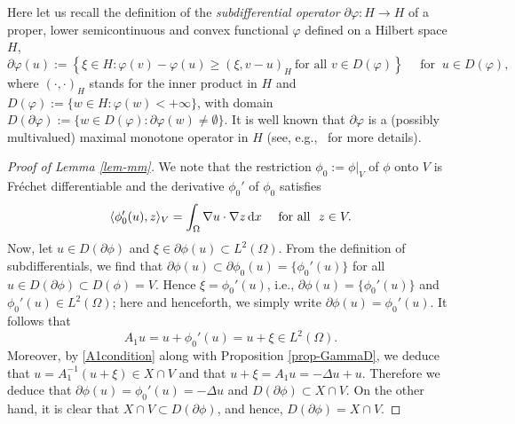 \documentclass[reqno,10pt]{amsart}
\begin{document}
Here let us recall the definition of the \emph{subdifferential operator}
$\partial \varphi : H \to H$ of a proper, lower semicontinuous and
convex functional $\varphi$ defined on a Hilbert space $H$,
\begin{equation}\label{subdif}
\partial \varphi(u) := \left\{
\xi \in H \colon \varphi(v) - \varphi(u) \geq (\xi, v - u)_H \ \mbox{
for all } v \in D(\varphi)
\right\}
\quad \mbox{ for } \ u \in D(\varphi),
\end{equation}
where $(\cdot,\cdot)_H$ stands for the inner product in $H$ and
$D(\varphi) := \{w \in H \colon \varphi(w) < +\infty\}$,
with domain $D(\partial \varphi) := \{w \in D(\varphi) \colon \partial
\varphi (w) \neq \emptyset\}$. It is well known that $\partial \varphi$
is a (possibly multivalued) maximal monotone operator in $H$ (see,
e.g.,~\cite{Bre73} for more details).
\begin{proof}[Proof of Lemma \ref{lem-mm}]
We note that the restriction $\phi_0 := \phi|_V$ of $\phi$ onto
 $V$ is Fr\'echet differentiable and the derivative $\phi_0'$ of
 $\phi_0$ satisfies
\begin{equation}\label{4}
\langle \phi_0'(u), z \rangle_V = \int_\Omega \nabla u \cdot
      \nabla z \, {\text{\rm d}} x \quad \mbox{ for all } \ z \in V.
\end{equation}
 Now, let $u \in D(\partial \phi)$ and $\xi \in \partial \phi(u) \subset
 L^2(\Omega)$. From the definition of subdifferentials, we find that $\partial
 \phi(u) \subset \partial \phi_0(u) = \{\phi_0'(u)\}$ for all $u \in
 D(\partial \phi) \subset D(\phi) = V$. Hence $\xi = \phi_0'(u)$, i.e.,
 $\partial \phi(u) = \{\phi_0'(u)\}$ and $\phi_0'(u) \in L^2(\Omega)$;
 here and henceforth, we simply write $\partial \phi(u) =
 \phi_0'(u)$. It follows that
$$
A_1 u = u + \phi_0'(u) = u + \xi \in L^2(\Omega). 
$$
Moreover, by \eqref{A1condition} along with Proposition
 \ref{prop-GammaD}, we deduce that $u = A_1^{-1} (u + \xi) \in X
 \cap V$ and that $u + \xi = A_1 u = - \Delta u + u$.
Therefore we deduce that $\partial \phi(u) = \phi_0'(u) = -\Delta u$ and
 $D(\partial \phi) \subset X \cap V$. On the other hand, it is clear
 that $X \cap V \subset D(\partial \phi)$, and hence, $D(\partial \phi)
 = X \cap V$.
\end{proof} 
\end{document}
